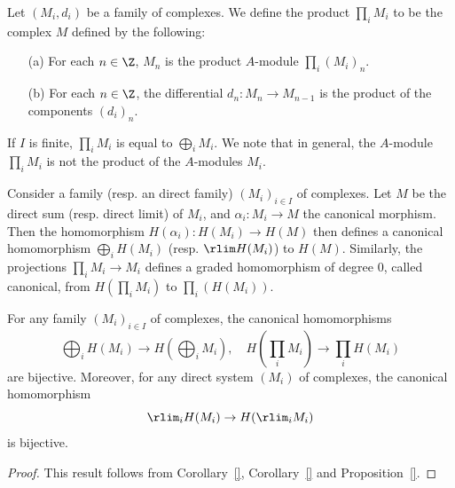 Let $(M_i,d_i)$ be a family of complexes. We define the product $\prod_iM_i$ to be the complex $M$ defined by the following:
\begin{itemize}
\item[(a)] For each $n\in\Z$, $M_n$ is the product $A$-module $\prod_i(M_i)_n$.
\item[(b)] For each $n\in\Z$, the differential $d_n:M_n\to M_{n-1}$ is the product of the components $(d_i)_n$. 
\end{itemize}
If $I$ is finite, $\prod_iM_i$ is equal to $\bigoplus_iM_i$. We note that in general, the $A$-module $\prod_iM_i$ is not the product of the $A$-modules $M_i$.\par
Consider a family (resp. an direct family) $(M_i)_{i\in I}$ of complexes. Let $M$ be the direct sum (resp. direct limit) of $M_i$, and $\alpha_i:M_i\to M$ the canonical morphism. Then the homomorphism $H(\alpha_i):H(M_i)\to H(M)$ then defines a canonical homomorphism $\bigoplus_iH(M_i)$ (resp. $\rlim H(M_i)$) to $H(M)$. Similarly, the projections $\prod_iM_i\to M_i$ defines a graded homomorphism of degree $0$, called canonical, from $H(\prod_iM_i)$ to $\prod_i(H(M_i))$.
\begin{proposition}\label{module complex homology preserve sum and prod direct limit}
For any family $(M_i)_{i\in I}$ of complexes, the canonical homomorphisms
\[\bigoplus_iH(M_i)\to H(\bigoplus_iM_i),\quad H(\prod_iM_i)\to\prod_iH(M_i)\]
are bijective. Moreover, for any direct system $(M_i)$ of complexes, the canonical homomorphism
\[\rlim_iH(M_i)\to H(\rlim_iM_i)\]
is bijective.
\end{proposition}
\begin{proof}
This result follows from Corollary~\ref{}, Corollary~\ref{} and Proposition~\ref{}.
\end{proof}
